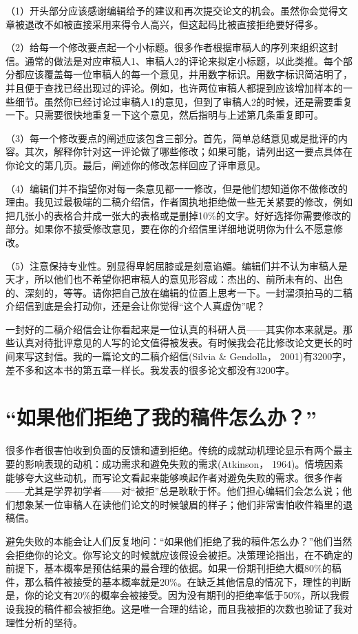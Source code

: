 （1）开头部分应该感谢编辑给予的建议和再次提交论文的机会。虽然你会觉得文章被退改不如被直接采用来得令人高兴，但这起码比被直接拒绝要好得多。

（2）给每一个修改要点起一个小标题。很多作者根据审稿人的序列来组织这封信。通常的做法是对应审稿人1、审稿人2的评论来拟定小标题，以此类推。每个部分都应该覆盖每一位审稿人的每一个意见，并用数字标识。用数字标识简洁明了，并且便于查找已经出现过的评论。例如，也许两位审稿人都提到应该增加样本的一些细节。虽然你已经讨论过审稿人1的意见，但到了审稿人2的时候，还是需要重复一下。只需要很快地重复一下这个意见，然后指明与上述第几条重复即可。

（3）每一个修改要点的阐述应该包含三部分。首先，简单总结意见或是批评的内容。其次，解释你针对这一评论做了哪些修改；如果可能，请列出这一要点具体在你论文的第几页。最后，阐述你的修改怎样回应了评审意见。

（4）编辑们并不指望你对每一条意见都一一修改，但是他们想知道你不做修改的理由。我见过最极端的二稿介绍信，作者固执地拒绝做一些无关紧要的修改，例如把几张小的表格合并成一张大的表格或是删掉10\%的文字。好好选择你需要修改的部分。如果你不接受修改意见，要在你的介绍信里详细地说明你为什么不愿意修改。

（5）注意保持专业性。别显得卑躬屈膝或是刻意谄媚。编辑们并不认为审稿人是天才，所以他们也不希望你把审稿人的意见形容成：杰出的、前所未有的、出色的、深刻的，等等。请你把自己放在编辑的位置上思考一下。一封溜须拍马的二稿介绍信到底是会打动你，还是会让你觉得“这个人真虚伪”呢？

一封好的二稿介绍信会让你看起来是一位认真的科研人员——其实你本来就是。那些认真对待批评意见的人写的论文值得被发表。有时候我会花比修改论文更长的时间来写这封信。我的一篇论文的二稿介绍信(Silvia \& Gendolla， 2001)有3200字，差不多和这本书的第五章一样长。我发表的很多论文都没有3200字。


\section{“如果他们拒绝了我的稿件怎么办？”}
很多作者很害怕收到负面的反馈和遭到拒绝。传统的成就动机理论显示有两个最主要的影响表现的动机：成功需求和避免失败的需求(Atkinson， 1964)。情境因素能够夸大这些动机，而写论文看起来能够唤起作者对避免失败的需求。很多作者——尤其是学界初学者——对“被拒”总是耿耿于怀。他们担心编辑们会怎么说；他们想象某一位审稿人在读他们论文的时候皱眉的样子；他们非常害怕收件箱里的退稿信。

避免失败的本能会让人们反复地问：“如果他们拒绝了我的稿件怎么办？”他们当然会拒绝你的论文。你写论文的时候就应该假设会被拒。决策理论指出，在不确定的前提下，基本概率是预估结果的最合理的依据。如果一份期刊拒绝大概80\%的稿件，那么稿件被接受的基本概率就是20\%。在缺乏其他信息的情况下，理性的判断是，你的论文有20\%的概率会被接受。因为没有期刊的拒绝率低于50\%，所以我假设我投的稿件都会被拒绝。这是唯一合理的结论，而且我被拒的次数也验证了我对理性分析的坚待。

